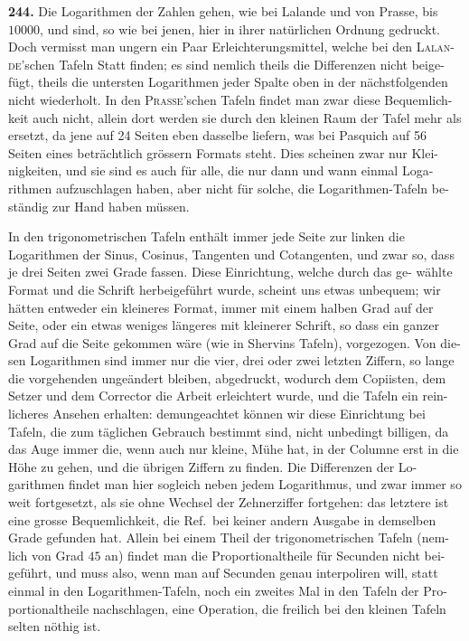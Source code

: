 \documentclass[12pt,a4paper]{article}
\begin{document}
\newpage
\noindent\textbf{244.}\quad
Die Logarithmen der Zahlen gehen, wie bei Lalande und von Prasse, bis
$10000$, und sind, so wie bei jenen, hier in ihrer natürlichen Ordnung gedruckt.
Doch vermisst man ungern ein Paar Erleichterungsmittel, welche bei den \textsc{Lalan}-
\textsc{de}'schen Tafeln Statt finden; es sind nemlich theils die Differenzen nicht beige-
fügt, theils die untersten Logarithmen jeder Spalte oben in der nächstfolgenden
nicht wiederholt. In den \textsc{Prasse}'schen Tafeln findet man zwar diese Bequemlich-
keit auch nicht, allein dort werden sie durch den kleinen Raum der Tafel mehr
als ersetzt, da jene auf 24 Seiten eben dasselbe liefern, was bei Pasquich auf 56
Seiten eines beträchtlich grössern Formats steht. Dies scheinen zwar nur Klei-
nigkeiten, und sie sind es auch für alle, die nur dann und wann einmal Loga-
rithmen aufzuschlagen haben, aber nicht für solche, die Logarithmen-Tafeln be-
ständig zur Hand haben müssen.

\smallskip\noindent
In den trigonometrischen Tafeln enthält immer jede Seite zur linken die
Logarithmen der Sinus, Cosinus, Tangenten und Cotangenten, und zwar so,
dass je drei Seiten zwei Grade fassen. Diese Einrichtung, welche durch das ge-
wählte Format und die Schrift herbeigeführt wurde, scheint uns etwas unbequem;
wir hätten entweder ein kleineres Format, immer mit einem halben Grad auf der
Seite, oder ein etwas weniges längeres mit kleinerer Schrift, so dass ein ganzer
Grad auf die Seite gekommen wäre (wie in Shervins Tafeln), vorgezogen. Von die-
sen Logarithmen sind immer nur die vier, drei oder zwei letzten Ziffern, so lange
die vorgehenden ungeändert bleiben, abgedruckt, wodurch dem Copiisten, dem
Setzer und dem Corrector die Arbeit erleichtert wurde, und die Tafeln ein rein-
licheres Ansehen erhalten: demungeachtet können wir diese Einrichtung bei
Tafeln, die zum täglichen Gebrauch bestimmt sind, nicht unbedingt billigen, da
das Auge immer die, wenn auch nur kleine, Mühe hat, in der Columne erst in
die Höhe zu gehen, und die übrigen Ziffern zu finden. Die Differenzen der Lo-
garithmen findet man hier sogleich neben jedem Logarithmus, und zwar immer
so weit fortgesetzt, als sie ohne Wechsel der Zehnerziffer fortgehen: das letztere
ist eine grosse Bequemlichkeit, die Ref.\ bei keiner andern Ausgabe in demselben
Grade gefunden hat. Allein bei einem Theil der trigonometrischen Tafeln (nem-
lich von Grad $45$ an) findet man die Proportionaltheile für Secunden nicht bei-
geführt, und muss also, wenn man auf Secunden genau interpoliren will, statt
einmal in den Logarithmen-Tafeln, noch ein zweites Mal in den Tafeln der Pro-
portionaltheile nachschlagen, eine Operation, die freilich bei den kleinen Tafeln
selten nöthig ist.
\end{document}
